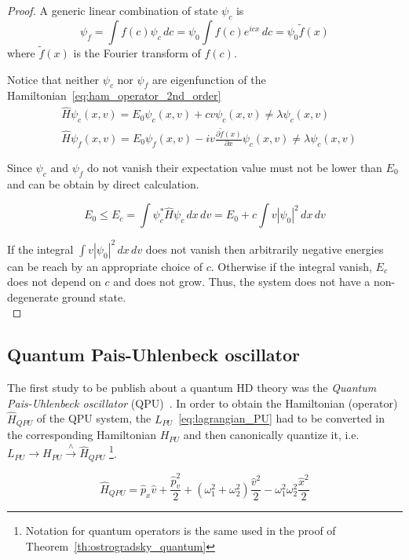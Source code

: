 \begin{proof}
  A generic linear combination of state $\psi_c$ is
  \begin{equation}
    \psi_f = \int f(c) \psi_c \, dc = \psi_0 \int f(c) e^{icx} \, dc =
    \psi_0 \tilde{f}(x)
  \end{equation}
  where $\tilde{f}(x)$ is the Fourier transform of $f(c)$.

  Notice that neither $\psi_c$ nor $\psi_f$ are eigenfunction of the
  Hamiltonian~\eqref{eq:ham_operator_2nd_order}
  \begin{align*}
    &\hat{H} \psi_c(x,v) = E_0\psi_c(x, v) + cv \psi_c(x,v)
    \neq \lambda \psi_c(x,v) \\
    &\hat{H} \psi_f(x,v) = E_0\psi_f(x, v) -
    iv \frac{\partial \tilde{f}(x)}{\partial x} \psi_c(x,v)
    \neq \lambda \psi_c(x,v)
  \end{align*}

  Since $\psi_c$ and $\psi_f$ do not vanish their expectation value
  must not be lower than $E_0$ and can be obtain by direct calculation.

  \begin{equation*}
    E_0 \leq E_c = \int \psi_c^* \hat{H} \psi_c \, dx \, dv =
    E_0 + c \int v \left|\psi_0 \right| ^2 \, dx \, dv
  \end{equation*}

  If the integral $\int v \left|\psi_0 \right| ^2 \, dx \, dv$ does not vanish
  then arbitrarily negative energies can be reach by an appropriate choice of $c$.
  Otherwise if the integral vanish, $E_c$ does not depend on $c$ and does not
  grow. Thus, the system does not have a non-degenerate ground state. \\
\end{proof}


\subsection{Quantum Pais-Uhlenbeck oscillator}
The first study to be publish about a quantum HD theory was the \emph{Quantum
Pais-Uhlenbeck oscillator} (QPU)~\cite{PU50}. In order to obtain the Hamiltonian
(operator) $\hat{H}_{QPU}$ of the QPU system,
the $L_{PU}$~\eqref{eq:lagrangian_PU} had to be converted in the corresponding
Hamiltonian $H_{PU}$ and then canonically quantize it, i.e.
$L_{PU} \rightarrow H_{PU} \xrightarrow{\wedge} \hat{H}_{QPU}$
\footnote{
  Notation for quantum operators is
  the same used in the proof of Theorem~\ref{th:ostrogradsky_quantum}
}.

\begin{equation} \label{eq:hamiltonian_QPU}
  \hat{H}_{QPU} = \hat{p}_x \hat{v} + \frac{\hat{p}_v^2}{2}
  + \left(\omega_1^2 + \omega_2^2\right)\frac{\hat{v}^2}{2}
  - \omega_1^2\omega_2^2 \frac{\hat{x}^2}{2}
\end{equation}

